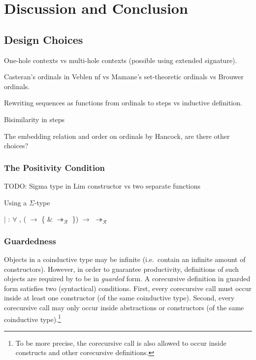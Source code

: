\chapter{Discussion and Conclusion}\label{chap:discussion}


\section{Design Choices}

One-hole contexts vs multi-hole contexts (possible using extended signature).

Casteran's ordinals in Veblen nf vs Mamane's set-theoretic ordinals vs Brouwer
ordinals.

Rewriting sequences as functions from ordinals to steps vs inductive
definition.

Bisimilarity in steps

The embedding relation and order on ordinals by Hancock, are there other
choices?


\subsection{The Positivity Condition}\label{sub:positivity}

TODO: Sigma type in Lim constructor vs two separate functions

Using a $\Sigma$-type
\begin{singlespace}
\begin{coqdoccode}
\coqdocindent{1.00em}
\ensuremath{|}    :
\ensuremath{\forall}  ,
(
\ensuremath{\rightarrow} \{  \& 
$\twoheadrightarrow_\mathcal{R}$
\}) $\rightarrow$
 $\twoheadrightarrow_\mathcal{R}$
\coqdoceol
\end{coqdoccode}
\end{singlespace}


\subsection{Guardedness}\label{sub:guardedness}

Objects in a coinductive type may be infinite (i.e.\ contain an infinite
amount of constructors). However, in order to guarantee productivity,
definitions of such objects are required by \Coq to be in \emph{guarded}
form. A corecursive definition in guarded form satisfies two (syntactical)
conditions. First, every corecursive call must occur inside at least one
constructor (of the same coinductive type). Second, every corecursive call may
only occur inside abstractions or constructors (of the same coinductive
type).\footnote{To be more precise, the corecursive call is also allowed to
  occur inside  constructs and other corecursive definitions.}

